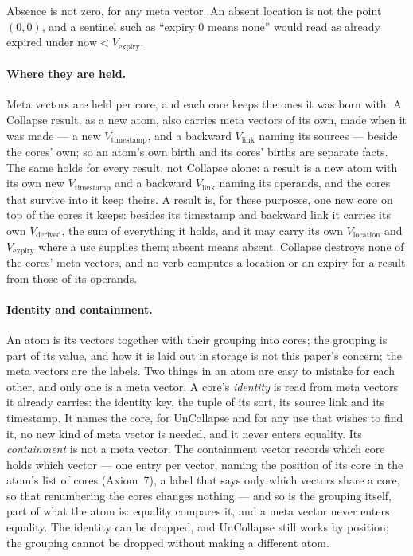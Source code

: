 \documentclass[12pt, a4paper]{article}
\begin{document}
Absence is not zero, for any meta vector. An absent location is not the
point $(0,0)$, and a sentinel such as ``expiry $0$ means none'' would
read as already expired under $\text{now}<V_{\text{expiry}}$.

\paragraph{Where they are held.} Meta vectors are held per core, and each
core keeps the ones it was born with. A Collapse result, as a new atom,
also carries meta vectors of its own, made when it was made --- a new
$V_{\text{timestamp}}$, and a backward $V_{\text{link}}$ naming its
sources --- beside the cores' own; so an atom's own birth and its cores' births are separate facts. The same holds for every result, not Collapse alone: a result is a new atom with its own new $V_{\text{timestamp}}$ and a backward $V_{\text{link}}$ naming its operands, and the cores that survive into it keep theirs. A result is, for these purposes, one new core on top of the cores it keeps: besides its timestamp and backward link it carries its own $V_{\text{derived}}$, the sum of everything it holds, and it may carry its own $V_{\text{location}}$ and $V_{\text{expiry}}$ where a use supplies them; absent means absent. Collapse destroys none of the cores' meta vectors, and no verb computes a location or an expiry for a result from those of its operands.

\paragraph{Identity and containment.} An atom is its vectors together with their grouping into cores; the grouping is part of its value, and how it is laid out in storage is not this paper's concern; the meta vectors are the labels. Two things in an atom are easy to mistake for each other, and only one is a meta vector. A core's \emph{identity} is read from meta vectors it already carries: the identity key, the tuple of its sort, its source link and its timestamp. It names the core, for UnCollapse and for any use that wishes to find it, no new kind of meta vector is needed, and it never enters equality. Its \emph{containment} is not a meta vector. The containment vector records which core holds which vector --- one entry per vector, naming the position of its core in the atom's list of cores (Axiom~7), a label that says only which vectors share a core, so that renumbering the cores changes nothing --- and so is the grouping itself, part of what the atom is: equality compares it, and a meta vector never enters equality. The identity can be dropped, and UnCollapse still works by position; the grouping cannot be dropped without making a different atom.
\end{document}
